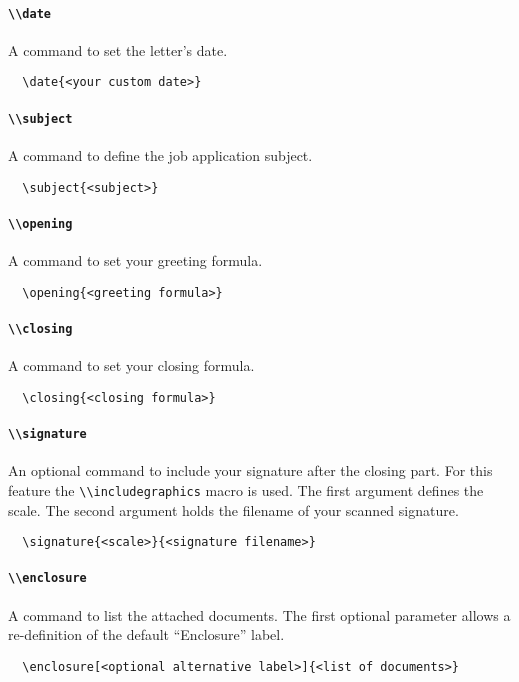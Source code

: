 \documentclass[a4paper, 11pt]{article}
\newcommand{\code}[1]{\lstinline!#1!}
\begin{document}
\paragraph{\code{\\date}}
A command to set the letter's date.
\begin{lstlisting}
  \date{<your custom date>}
\end{lstlisting}

\paragraph{\code{\\subject}}
A command to define the job application subject.
\begin{lstlisting}
  \subject{<subject>}
\end{lstlisting}

\paragraph{\code{\\opening}}
A command to set your greeting formula.
\begin{lstlisting}
  \opening{<greeting formula>}
\end{lstlisting}

\paragraph{\code{\\closing}}
A command to set your closing formula.
\begin{lstlisting}
  \closing{<closing formula>}
\end{lstlisting}

\paragraph{\code{\\signature}}
An optional command to include your signature after the closing part. For this feature the \code{\\includegraphics} macro is used. The first argument defines the scale. The second argument holds the filename of your scanned signature.
\begin{lstlisting}
  \signature{<scale>}{<signature filename>}
\end{lstlisting}

\paragraph{\code{\\enclosure}}
A command to list the attached documents. The first optional parameter allows a re-definition of the default ``Enclosure'' label.
\begin{lstlisting}
  \enclosure[<optional alternative label>]{<list of documents>}
\end{lstlisting}
\end{document}
